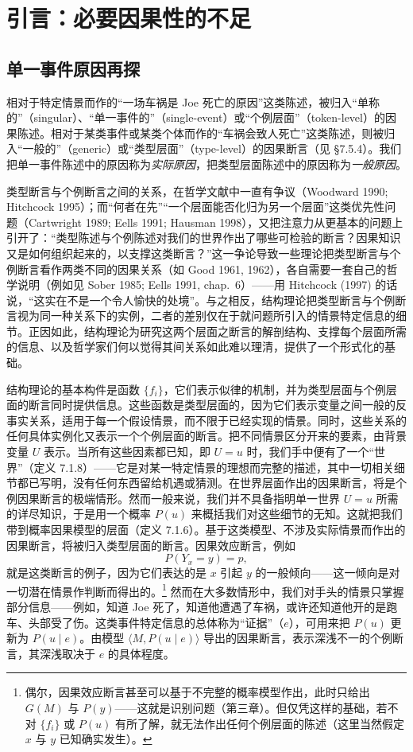 \section{引言：必要因果性的不足}

\subsection{单一事件原因再探}

相对于特定情景而作的“一场车祸是 Joe 死亡的原因”这类陈述，被归入“单称的”（singular）、“单一事件的”（single-event）或“个例层面”（token-level）的因果陈述。相对于某类事件或某类个体而作的“车祸会致人死亡”这类陈述，则被归入“一般的”（generic）或“类型层面”（type-level）的因果断言（见 \S 7.5.4）。我们把单一事件陈述中的原因称为\emph{实际原因}，把类型层面陈述中的原因称为\emph{一般原因}。

类型断言与个例断言之间的关系，在哲学文献中一直有争议（Woodward 1990; Hitchcock 1995）；而“何者在先”“一个层面能否化归为另一个层面”这类优先性问题（Cartwright 1989; Eells 1991; Hausman 1998），又把注意力从更基本的问题上引开了：“类型陈述与个例陈述对我们的世界作出了哪些可检验的断言？因果知识又是如何组织起来的，以支撑这类断言？”这一争论导致一些理论把类型断言与个例断言看作两类不同的因果关系（如 Good 1961, 1962），各自需要一套自己的哲学说明（例如见 Sober 1985; Eells 1991, chap.~6）——用 Hitchcock (1997) 的话说，“这实在不是一个令人愉快的处境”。与之相反，结构理论把类型断言与个例断言视为同一种关系下的实例，二者的差别仅在于就问题所引入的情景特定信息的细节。正因如此，结构理论为研究这两个层面之断言的解剖结构、支撑每个层面所需的信息、以及哲学家们何以觉得其间关系如此难以理清，提供了一个形式化的基础。

结构理论的基本构件是函数 $\{f_i\}$，它们表示似律的机制，并为类型层面与个例层面的断言同时提供信息。这些函数是类型层面的，因为它们表示变量之间一般的反事实关系，适用于每一个假设情景，而不限于已经实现的情景。同时，这些关系的任何具体实例化又表示一个个例层面的断言。把不同情景区分开来的要素，由背景变量 $U$ 表示。当所有这些因素都已知，即 $U=u$ 时，我们手中便有了一个“世界”（定义 7.1.8）——它是对某一特定情景的理想而完整的描述，其中一切相关细节都已写明，没有任何东西留给机遇或猜测。在世界层面作出的因果断言，将是个例因果断言的极端情形。然而一般来说，我们并不具备指明单一世界 $U=u$ 所需的详尽知识，于是用一个概率 $P(u)$ 来概括我们对这些细节的无知。这就把我们带到概率因果模型的层面（定义 7.1.6）。基于这类模型、不涉及实际情景而作出的因果断言，将被归入类型层面的断言。因果效应断言，例如
\[
P(Y_x=y)=p,
\]
就是这类断言的例子，因为它们表达的是 $x$ 引起 $y$ 的一般倾向——这一倾向是对一切潜在情景作判断而得出的。\footnote{偶尔，因果效应断言甚至可以基于不完整的概率模型作出，此时只给出 $G(M)$ 与 $P(y)$——这就是识别问题（第三章）。但仅凭这样的基础，若不对 $\{f_i\}$ 或 $P(u)$ 有所了解，就无法作出任何个例层面的陈述（这里当然假定 $x$ 与 $y$ 已知确实发生）。} 然而在大多数情形中，我们对手头的情景只掌握部分信息——例如，知道 Joe 死了，知道他遭遇了车祸，或许还知道他开的是跑车、头部受了伤。这类事件特定信息的总体称为“证据”（$e$），可用来把 $P(u)$ 更新为 $P(u\mid e)$。由模型 $\langle M,P(u\mid e)\rangle$ 导出的因果断言，表示深浅不一的个例断言，其深浅取决于 $e$ 的具体程度。

